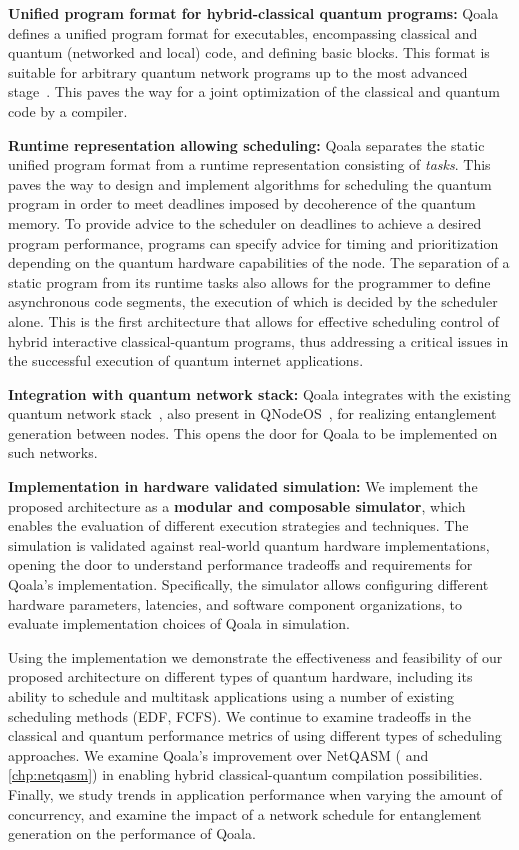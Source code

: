 \textbf{Unified program format for hybrid-classical quantum programs:}
Qoala defines a unified program format for executables, encompassing classical and quantum (networked and local) code, and defining basic blocks.
This format is suitable for arbitrary quantum network programs up to the most advanced stage~\cite{wehner2018quantum}.
This paves the way for a joint optimization of the classical and quantum code by a compiler.

\textbf{Runtime representation allowing scheduling:} Qoala separates the static unified program format from a runtime representation consisting of \textit{tasks}. 
This paves the way to design and implement algorithms for scheduling the quantum program in order to meet deadlines imposed by decoherence of the quantum memory.  
To provide advice to the scheduler on deadlines to achieve a desired program performance, programs can specify advice for timing and prioritization depending 
on the quantum hardware capabilities of the node. 
The separation of a static program from its runtime tasks also allows for the programmer to define asynchronous code segments, the execution of which is decided by the scheduler alone.
This is the first architecture that allows for effective scheduling control of hybrid interactive classical-quantum programs, thus addressing a critical issues in the successful execution of quantum internet applications.

\textbf{Integration with quantum network stack:}
Qoala integrates with the existing quantum network stack~\cite{dahlberg2019link}, also present in QNodeOS~\cite{pompili2022experimental}, for realizing entanglement generation between nodes. This opens the door for Qoala to be implemented on such networks.

\textbf{Implementation in hardware validated simulation:}
We implement the proposed architecture as a \textbf{modular and composable simulator}, which enables the evaluation of different execution strategies and techniques.
The simulation is validated against real-world quantum hardware implementations, opening the door to understand performance tradeoffs and requirements for Qoala's implementation.
Specifically, the simulator allows configuring different hardware parameters, latencies, and software component organizations, to evaluate implementation choices of Qoala in simulation. 

Using the implementation we demonstrate the effectiveness and feasibility of our proposed architecture on different types of quantum hardware, including its ability to schedule and multitask applications using a number of existing scheduling methods (EDF, FCFS).
We continue to examine tradeoffs in the classical and quantum performance metrics of using different types of scheduling approaches. 
We examine Qoala's improvement over NetQASM (\cite{dahlberg2022netqasm} and \cref{chp:netqasm}) in enabling hybrid classical-quantum compilation possibilities. 
Finally, we study trends in application performance when varying the amount of concurrency, and examine the impact of a network schedule for entanglement generation on the performance of Qoala.


